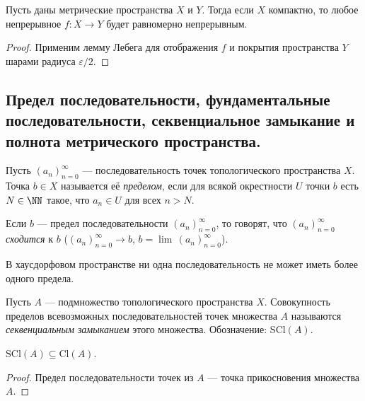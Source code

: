 \documentclass[12pt,a4paper]{article}
\newcommand{\Cl}{\ensuremath{\mathrm{Cl}}\xspace}
\newcommand{\SCl}{\ensuremath{\mathrm{SCl}}\xspace}
\begin{document}
    \begin{theorem}
        Пусть даны метрические пространства $X$ и $Y$. Тогда если $X$ компактно, то любое непрерывное $f: X \to Y$ будет равномерно непрерывным.
    \end{theorem}

    \begin{proof}
        Применим лемму Лебега для отображения $f$ и покрытия пространства $Y$ шарами радиуса $\varepsilon/2$.
    \end{proof}

    \subsection{Предел последовательности, фундаментальные последовательности, секвенциальное замыкание и полнота метрического пространства.}

    \begin{definition}
        Пусть $(a_n)_{n=0}^\infty$ --- последовательность точек топологического пространства $X$. Точка $b \in X$ называется её \emph{пределом}, если для всякой окрестности $U$ точки $b$ есть $N \in \NN$ такое, что $a_n \in U$ для всех $n > N$.
        
        Если $b$ --- предел последовательности $(a_n)_{n=0}^\infty$, то говорят, что $(a_n)_{n=0}^\infty$ \emph{сходится} к $b$ ($(a_n)_{n=0}^\infty \to b$, $b = \lim\, (a_n)_{n=0}^\infty$).
    \end{definition}

    \begin{theorem}
        В хаусдорфовом пространстве ни одна последовательность не может иметь более одного предела.
    \end{theorem}

    \begin{definition}
        Пусть $A$ --- подмножество топологического пространства $X$. Совокупность пределов всевозможных последовательностей точек множества $A$ называются \emph{секвенциальным замыканием} этого множества. Обозначение: $\SCl(A)$.
    \end{definition}

    \begin{theorem}
        $\SCl(A) \subseteq \Cl(A)$.
    \end{theorem}

    \begin{proof}
        Предел последовательности точек из $A$ --- точка прикосновения множества $A$.
    \end{proof}
\end{document}
